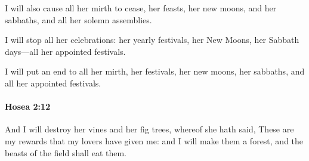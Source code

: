 			\begin{versebox}
					\item[BHS] 
					\item[LXX] 
					\item[ASV] I will also cause all her mirth to cease, her feasts, her new moons, and her sabbaths, and all her solemn assemblies.
					\item[NIV] I will stop all her celebrations: her yearly festivals, her New Moons, her Sabbath days—all her appointed festivals.
					\item[NRSV] I will put an end to all her mirth, her festivals, her new moons, her sabbaths, and all her appointed festivals.
			\end{versebox}

		\paragraph{Hosea 2:12} %
			\label{HOSEA-2-12}

			And I will destroy her vines and her fig trees, whereof she hath said, These are my rewards that my lovers have given me: and I will make them a forest, and the beasts of the field shall eat them.


